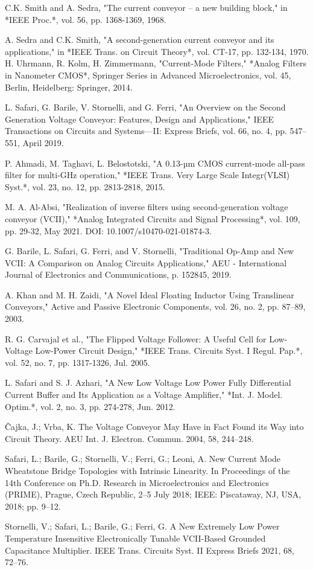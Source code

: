 \documentclass{./styles/svproc}
\begin{document}
\begin{thebibliography}{00}
 C.K. Smith and A. Sedra, "The current conveyor – a new building block," in *IEEE Proc.*, vol. 56, pp. 1368-1369, 1968.

 A. Sedra and C.K. Smith, "A second-generation current conveyor and its applications," in *IEEE Trans. on Circuit Theory*, vol. CT-17, pp. 132-134, 1970.
 H. Uhrmann, R. Kolm, H. Zimmermann, "Current-Mode Filters," *Analog Filters in Nanometer CMOS*, Springer Series in Advanced Microelectronics, vol. 45, Berlin, Heidelberg: Springer, 2014.

 L. Safari, G. Barile, V. Stornelli, and G. Ferri, "An Overview on the Second Generation Voltage Conveyor: Features, Design and Applications," IEEE Transactions on Circuits and Systems—II: Express Briefs, vol. 66, no. 4, pp. 547–551, April 2019.

 P. Ahmadi, M. Taghavi, L. Belostotski, "A 0.13-µm CMOS current-mode all-pass filter for multi-GHz operation," *IEEE Trans. Very Large Scale Integr(VLSI) Syst.*, vol. 23, no. 12, pp. 2813-2818, 2015.

 M. A. Al-Absi, "Realization of inverse filters using second-generation voltage conveyor (VCII)," *Analog Integrated Circuits and Signal Processing*, vol. 109, pp. 29-32, May 2021. DOI: 10.1007/s10470-021-01874-3.

 G. Barile, L. Safari, G. Ferri, and V. Stornelli, "Traditional Op-Amp and New VCII: A Comparison on Analog Circuits Applications," AEU - International Journal of Electronics and Communications, p. 152845, 2019.

 A. Khan and M. H. Zaidi, "A Novel Ideal Floating Inductor Using Translinear Conveyors," Active and Passive Electronic Components, vol. 26, no. 2, pp. 87–89, 2003.

 R. G. Carvajal et al., "The Flipped Voltage Follower: A Useful Cell for Low-Voltage Low-Power Circuit Design," *IEEE Trans. Circuits Syst. I Regul. Pap.*, vol. 52, no. 7, pp. 1317-1326, Jul. 2005.

L. Safari and S. J. Azhari, "A New Low Voltage Low Power Fully Differential Current Buffer and Its Application as a Voltage Amplifier," *Int. J. Model. Optim.*, vol. 2, no. 3, pp. 274-278, Jun. 2012.

Čajka, J.; Vrba, K. The Voltage Conveyor May Have in Fact Found its Way into Circuit Theory. AEU Int. J. Electron. Commun. 2004, 58, 244–248.


Safari, L.; Barile, G.; Stornelli, V.; Ferri, G.; Leoni, A. New Current Mode Wheatstone Bridge Topologies with Intrinsic Linearity. In Proceedings of the 14th Conference on Ph.D. Research in Microelectronics and Electronics (PRIME), Prague, Czech Republic, 2–5 July 2018; IEEE: Piscataway, NJ, USA, 2018; pp. 9–12.

Stornelli, V.; Safari, L.; Barile, G.; Ferri, G. A New Extremely Low Power Temperature Insensitive Electronically Tunable VCII-Based Grounded Capacitance Multiplier. IEEE Trans. Circuits Syst. II Express Briefs 2021, 68, 72–76.


\end{thebibliography}
\vspace{12pt}

%
%
\end{document}
